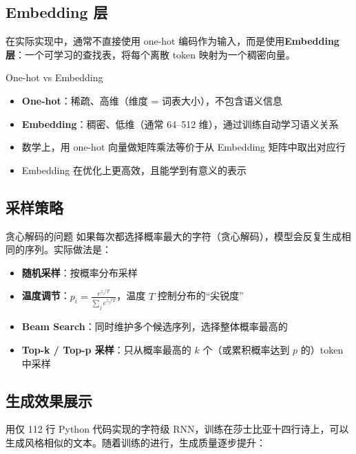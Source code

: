 \documentclass[a4paper]{article}
\begin{document}
\subsection{Embedding 层}

在实际实现中，通常不直接使用 one-hot 编码作为输入，而是使用\textbf{Embedding 层}：一个可学习的查找表，将每个离散 token 映射为一个稠密向量。

\begin{knowledgebox}{One-hot vs Embedding}
\begin{itemize}
    \item \textbf{One-hot}：稀疏、高维（维度 = 词表大小），不包含语义信息
    \item \textbf{Embedding}：稠密、低维（通常 64--512 维），通过训练自动学习语义关系
    \item 数学上，用 one-hot 向量做矩阵乘法等价于从 Embedding 矩阵中取出对应行
    \item Embedding 在优化上更高效，且能学到有意义的表示
\end{itemize}
\end{knowledgebox}

\subsection{采样策略}

\begin{warningbox}{贪心解码的问题}
如果每次都选择概率最大的字符（贪心解码），模型会反复生成相同的序列。实际做法是：
\begin{itemize}
    \item \textbf{随机采样}：按概率分布采样
    \item \textbf{温度调节}：$p_i = \frac{e^{z_i / T}}{\sum_j e^{z_j / T}}$，温度 $T$ 控制分布的``尖锐度''
    \item \textbf{Beam Search}：同时维护多个候选序列，选择整体概率最高的
    \item \textbf{Top-k / Top-p 采样}：只从概率最高的 $k$ 个（或累积概率达到 $p$ 的）token 中采样
\end{itemize}
\end{warningbox}

\subsection{生成效果展示}

用仅 112 行 Python 代码实现的字符级 RNN，训练在莎士比亚十四行诗上，可以生成风格相似的文本。随着训练的进行，生成质量逐步提升：
\end{document}
